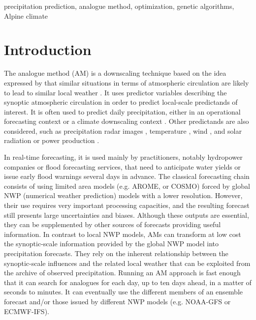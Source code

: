 \documentclass[review]{elsarticle}
\begin{document}
\begin{frontmatter}
\begin{keyword}
	precipitation prediction\sep
	analogue method\sep
	optimization\sep
	genetic algorithms\sep
	Alpine climate
\end{keyword}
	
\end{frontmatter}

\linenumbers

\section{Introduction}
\label{sec:intro}

The analogue method (AM) is a downscaling technique based on the idea expressed by \citet{Lorenz1956, Lorenz1969} that similar situations in terms of atmospheric circulation are likely to lead to similar local weather \citep{Duband1970}. It uses predictor variables describing the synoptic atmospheric circulation in order to predict local-scale predictands of interest. It is often used to predict daily precipitation, either in an operational forecasting context \citep[e.g.][]{Guilbaud1997, Bontron2005, Hamill2006, Bliefernicht2010, Marty2012, Horton2012, Horton2016a, Hamill2015, BenDaoud2016} or a climate downscaling context \citep[e.g.][]{Radanovics2013, Chardon2014, Dayon2015, Raynaud2016b}. Other predictands are also considered, such as precipitation radar images \citep{Panziera2011,Foresti2015a}, temperature \citep{Radinovic1975, Woodcock1980, Kruizinga1983, DelleMonache2013, Caillouet2016, Raynaud2016b}, wind \citep{Gordon1987, DelleMonache2013, DelleMonache2011, Vanvyve2015, Alessandrini2015, Junk2015, Junk2015c}, and solar radiation or power production \citep{Alessandrini2015a, Bessa2015, Raynaud2016b}.

In real-time forecasting, it is used mainly by practitioners, notably hydropower companies or flood forecasting services, that need to anticipate water yields or issue early flood warnings several days in advance. The classical forecasting chain consists of using limited area models (e.g. AROME, or COSMO) forced by global NWP (numerical weather prediction) models with a lower resolution. However, their use requires very important processing capacities, and the resulting forecast still presents large uncertainties and biases. Although these outputs are essential, they can be supplemented by other sources of forecasts providing useful information. In contrast to local NWP models, AMs can transform at low cost the synoptic-scale information provided by the global NWP model into precipitation forecasts. They rely on the inherent relationship between the synoptic-scale influences and the related local weather that can be exploited from the archive of observed precipitation. Running an AM approach is fast enough that it can search for analogues for each day, up to ten days ahead, in a matter of seconds to minutes. It can eventually use the different members of an ensemble forecast and/or those issued by different NWP models (e.g. NOAA-GFS or ECMWF-IFS).
\end{document}
